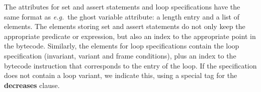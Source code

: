 
The attributes for set and assert statements and loop specifications
have the same format as \emph{e.g.}\ the ghost variable attribute: a
length entry and a list of elements.  The elements storing set and
assert statements do not only keep the appropriate predicate or
expression, but also an index to the appropriate point in the
bytecode. Similarly, the elements for loop specifications contain the
loop specification (invariant, variant and frame conditions), plus an
index to the bytecode instruction that corresponds to the entry of the
loop. If the specification does not contain a loop variant, we
indicate this, using a special tag for the
\textbf{decreases} clause.



